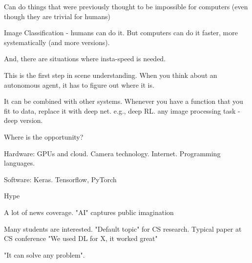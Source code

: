 \documentclass[english]{article}
\begin{document}
\eitem

\bitem
\item Can do things that were previously thought to be impossible for computers (even though they are trivial for humans)

Image Classification - humans can do it. But computers can do it faster, more systematically (and more versions). 

And, there are situations where insta-speed is needed.

This is the first step in scene understanding. When you think about an autonomous agent, it has to figure out where it is. 

It can be combined with other systems. Whenever you have a function that you fit to data, replace it with deep net. e.g., deep RL. any image processing task - deep version. 

Where is the opportunity?


\eitem





\item Hardware: GPUs and cloud. Camera technology. Internet. Programming languages.

\item Software:  Keras. Tensorflow, PyTorch

\item Hype

\bitem
\item A lot of news coverage. "AI" captures public imagination %
\item Many students are interested. "Default topic" for CS research. Typical paper at CS conference "We used DL for X, it worked great"

\item "It can solve any problem". 
\eitem
\end{document}
